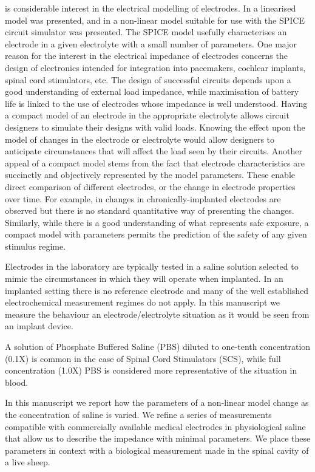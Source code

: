 \documentclass[journal, a4paper]{IEEEtran}
\begin{document}
 is considerable interest in the electrical modelling of electrodes. \cite{Cogan2008,Troy2006}
In \cite{Franks2005} a linearised model was presented, and in \cite{ScottSingle2013} a non-linear model
suitable for use with the SPICE circuit simulator was presented. The SPICE model usefully characterises an electrode in a given electrolyte with a small number of parameters.
One major reason for the interest in the electrical impedance of electrodes concerns the design of electronics intended for integration into pacemakers, cochlear implants, spinal cord stimulators, etc. The design of successful circuits depends upon a good understanding of external load impedance, while maximisation of battery life is linked to the use of electrodes whose impedance is well understood.
Having a compact model of an electrode in the appropriate electrolyte allows circuit designers to simulate their designs with valid loads. Knowing the effect upon the model of changes in the electrode or electrolyte would allow designers to anticipate circumstances that will affect the load seen by their circuits. Another appeal of a compact model stems from the fact that electrode characteristics are succinctly and objectively represented by the model parameters. These enable direct comparison of different electrodes, or the change in electrode properties over time. For example, in \cite{Kane13} changes in chronically-implanted electrodes are observed but there is no standard quantitative way of presenting the changes. Similarly, while there is a good understanding of what represents safe exposure, a compact model with parameters permits the prediction of the safety of any given stimulus regime.~\cite{Merrill05}

{\color{blue} Electrodes in the laboratory are typically tested in a saline solution selected to mimic the circumstances in which they will operate when implanted.
In an implanted setting there is no reference electrode and many of the well established electrochemical measurement regimes do not apply. In this manuscript we measure the behaviour an electrode/electrolyte situation as it would be seen from an implant device.

A solution of Phosphate Buffered Saline (PBS) diluted to one-tenth concentration (0.1X) is common in the case of Spinal Cord Stimulators (SCS), while full concentration (1.0X) PBS is considered more representative of the situation in blood.}

In this manuscript we report how the parameters of a non-linear model change as the concentration of saline is varied. {\color{blue} We refine a series of measurements compatible with commercially available medical electrodes in physiological saline that allow us to describe the impedance with minimal parameters.} We place these parameters in context with a biological measurement made in the spinal cavity of a live sheep.
\end{document}
